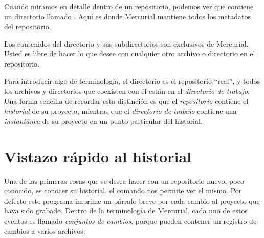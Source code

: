 Cuando miramos en detalle dentro de un repositorio, podemos ver que
contiene un directorio llamado . Aquí es donde Mercurial
mantiene todos los metadatos del repositorio.

Los contenidos del directorio  y sus subdirectorios son
exclusivos de Mercurial. Usted es libre de hacer lo que desee con
cualquier otro archivo o directorio en el repositorio.

Para introducir algo de terminología, el directorio  es
el repositorio ``real'', y todos los archivos y directorios que
coexisten con él están en el \emph{directorio de trabajo}. Una forma
sencilla de recordar esta distinción es que el \emph{repositorio}
contiene el \emph{historial} de su proyecto, mientras que el
\emph{directorio de trabajo} contiene una \emph{instantánea} de su
proyecto en un punto particular del historial.

\section{Vistazo rápido al historial}

Una de las primeras cosas que se desea hacer con un repositorio nuevo,
poco conocido, es conocer su historial. el comando  nos
permite ver el mismo.
Por defecto este programa imprime un párrafo breve por cada cambio al
proyecto que haya sido grabado. Dentro de la terminología de
Mercurial, cada uno de estos eventos es llamado \emph{conjuntos de
cambios}, porque pueden contener un registro de cambios a varios
archivos.

